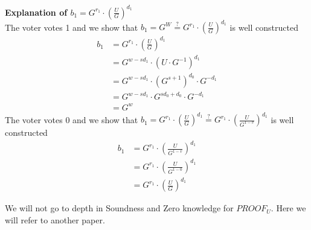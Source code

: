 \noindent
\textbf{Explanation of \begin{math}b_1= G^{r_1}  \cdot (\frac{U}{G})^{d_1}\end{math}}\\

\noindent
The voter votes 1 and we show that \begin{math}b_1=   G^W \stackrel{?}{=} G^{r_1}  \cdot (\frac{U}{G})^{d_1} \end{math} is well constructed \begin{align*}
    b_1 &= G^{r_1}  \cdot (\frac{U}{G})^{d_1}                   \\
        &= G^{w-sd_1} \cdot (U \cdot G^{-1})^{d_1}              \\
        &= G^{w-sd_1} \cdot  (G^{s+1})^{d_0} \cdot G^{-d_1}     \\
        &= G^{w-sd_1} \cdot  G^{sd_0+d_0} \cdot G^{-d_1}        \\
        &= G^w
\end{align*}
The voter votes 0 and we show that  \begin{math}b_1= G^{r_1}  \cdot (\frac{U}{G})^{d_1}  \stackrel{?}{=}  G^{r_1}  \cdot (\frac{U}{G^{1-v}})^{d_1} \end{math} is well constructed
\begin{align*}
    b_1 &= G^{r_1}  \cdot (\frac{U}{G^{1-v}})^{d_1}             \\ 
        &= G^{r_1}  \cdot (\frac{U}{G^{1-0}})^{d_1}             \\
        &= G^{r_1}  \cdot (\frac{U}{G})^{d_1}
\end{align*}



\noindent
We will not go to depth in Soundness and Zero knowledge for $PROOF_U$. Here we will refer to another paper. \cite{Cramer1994}



